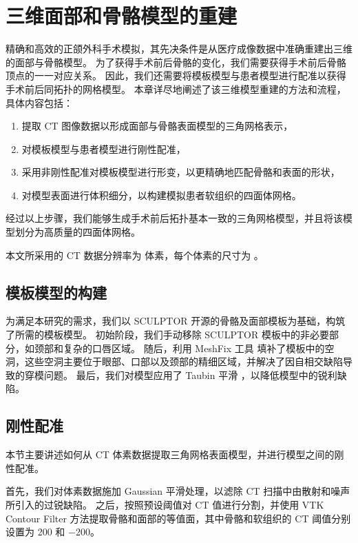 
\chapter{三维面部和骨骼模型的重建}
\label{cha:reconstruction}

精确和高效的正颌外科手术模拟，其先决条件是从医疗成像数据中准确重建出三维的面部与骨骼模型。
为了获得手术前后骨骼的变化，我们需要获得手术前后骨骼顶点的一一对应关系。
因此，我们还需要将模板模型与患者模型进行配准以获得手术前后同拓扑的网格模型。
本章详尽地阐述了该三维模型重建的方法和流程，具体内容包括：
\begin{enumerate}
  \item 提取 CT 图像数据以形成面部与骨骼表面模型的三角网格表示，
  \item 对模板模型与患者模型进行刚性配准，
  \item 采用非刚性配准对模板模型进行形变，以更精确地匹配骨骼和表面的形状，
  \item 对模型表面进行体积细分，以构建模拟患者软组织的四面体网格。
\end{enumerate}
经过以上步骤，我们能够生成手术前后拓扑基本一致的三角网格模型，并且将该模型划分为高质量的四面体网格。

本文所采用的 CT 数据分辨率为  体素，每个体素的尺寸为 。

\section{模板模型的构建}

为满足本研究的需求，我们以 SCULPTOR \cite{qiuSCULPTORSkeletonconsistentFace2022a} 开源的骨骼及面部模板为基础，构筑了所需的模板模型。
初始阶段，我们手动移除 SCULPTOR 模板中的非必要部分，如颈部和复杂的口唇区域。
随后，利用 MeshFix 工具 \cite{atteneLightweightApproachRepairing2010} 填补了模板中的空洞，这些空洞主要位于眼部、口部以及颈部的精细区域，并解决了因自相交缺陷导致的穿模问题。
最后，我们对模型应用了 Taubin 平滑 \cite{vollmerImprovedLaplacianSmoothing1999}，以降低模型中的锐利缺陷。

\section{刚性配准}

本节主要讲述如何从 CT 体素数据提取三角网格表面模型，并进行模型之间的刚性配准。

首先，我们对体素数据施加 Gaussian 平滑处理，以滤除 CT 扫描中由散射和噪声所引入的过锐缺陷。
之后，按照预设阈值对 CT 值进行分割，并使用 VTK Contour Filter 方法提取骨骼和面部的等值面，其中骨骼和软组织的 CT 阈值分别设置为 \num{200} 和 \num{-200}。

